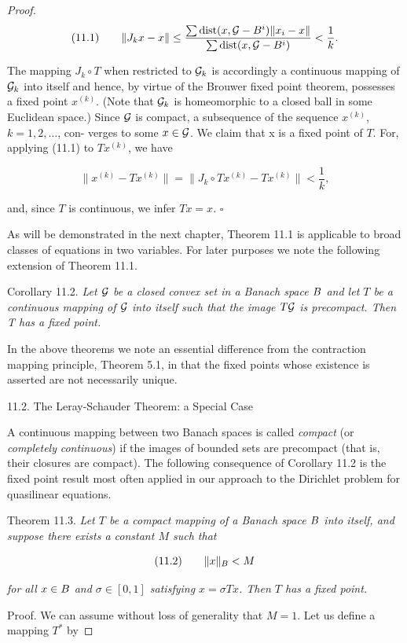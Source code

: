 \begin{proof}
\[(11.1)\qquad \|J_k x - x\| \le \frac{\sum \operatorname{dist}(x,\mathcal{G}-B^i)\|x_i-x\|}{\sum \operatorname{dist}(x,\mathcal{G}-B^i)} < \frac{1}{k}.\]

The mapping $J_k \circ T$ when restricted to $\mathcal{G}_k$ is accordingly a continuous mapping of
$\mathcal{G}_k$ into itself and hence, by virtue of the Brouwer fixed point theorem, possesses a
fixed point $x^{(k)}$. (Note that $\mathcal{G}_k$ is homeomorphic to a closed ball in some Euclidean
space.) Since $\mathcal{G}$ is compact, a subsequence of the sequence $x^{(k)}$, $k = 1, 2, \ldots$, con-
verges to some $x \in \mathcal{G}$. We claim that x is a fixed point of $T$. For, applying (11.1) to
$Tx^{(k)}$, we have

\[
\|x^{(k)} - Tx^{(k)}\| = \|J_k \circ T x^{(k)} - Tx^{(k)}\| < \frac{1}{k},
\]

and, since $T$ is continuous, we infer $Tx = x$. $\square$

As will be demonstrated in the next chapter, Theorem 11.1 is applicable to
broad classes of equations in two variables. For later purposes we note the following
extension of Theorem 11.1.

Corollary 11.2. \emph{Let $\mathcal{G}$ be a closed convex set in a Banach space $B$ and let $T$ be a
continuous mapping of $\mathcal{G}$ into itself such that the image $T\mathcal{G}$ is precompact. Then T has
a fixed point.}

In the above theorems we note an essential difference from the contraction
mapping principle, Theorem 5.1, in that the fixed points whose existence is asserted
are not necessarily unique.

11.2. The Leray-Schauder Theorem: a Special Case

A continuous mapping between two Banach spaces is called \emph{compact} (or \emph{completely}
\emph{continuous}) if the images of bounded sets are precompact (that is, their closures are
compact). The following consequence of Corollary 11.2 is the fixed point result
most often applied in our approach to the Dirichlet problem for quasilinear
equations.

Theorem 11.3. \emph{Let $T\!$ be a compact mapping of a Banach space $B$ into itself, and
suppose there exists a constant $M$ such that}

\[(11.2)\qquad \|x\|_{B} < M\]

\emph{for all $x \in B$ and $\sigma \in [0,1]$ satisfying $x = \sigma Tx$. Then $T$ has a fixed point.}

Proof. We can assume without loss of generality that $M = 1$. Let us define a
mapping $T^*$ by


\end{proof}
